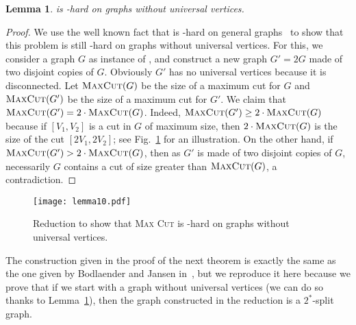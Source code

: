 \documentclass[
final
]{dmtcs-episciences}
\newtheorem{lemma}{Lemma}{\bfseries}{\itshape}
\begin{document}
\begin{lemma}\label{lemma4.3}
{} is {}-hard on graphs without universal vertices.		
\end{lemma}
\begin{proof}
We use the well known fact that {} is {}-hard on general graphs~\cite{garey1976some} to show that this problem is still {}-hard on graphs without universal vertices. For this, we consider a graph $G$ as instance of  {}, and construct a new graph $G'=2G$ made of two disjoint copies of $G$. Obviously $G'$ has no universal vertices because it is disconnected.
Let $\textsc{MaxCut}(G)$ be the size of a maximum cut for $G$ and $\textsc{MaxCut}(G')$ be the size of a maximum cut for $G'$. We claim that $\textsc{MaxCut}(G')=2 \cdot \textsc{MaxCut}(G)$. Indeed, $\textsc{MaxCut}(G')\geq 2 \cdot \textsc{MaxCut}(G)$ because if $[V_1,V_2]$ is a cut in $G$ of maximum size, then $2 \cdot \textsc{MaxCut}(G)$ is the size of the cut $[2V_1,2V_2]$; see Fig.~\ref{fig:no-universal-vertices} for an illustration. On the other hand, if $\textsc{MaxCut}(G')>2 \cdot \textsc{MaxCut}(G)$, then as $G'$ is made of two disjoint copies of $G$, necessarily $G$ contains a cut of size greater than $\textsc{MaxCut}(G)$, a contradiction.
\end{proof}

\begin{figure}[h]
\vspace{-1.2cm}
\begin{center}
 \texttt{[image: lemma10.pdf]}
\vspace{-.35cm}\caption{Reduction to show that \textsc{Max Cut} is {}-hard on graphs without universal vertices.} \label{fig:no-universal-vertices}\vspace{-.2cm}
\end{center}
\end{figure}

The construction given in the proof of the next theorem is exactly the same as the one given by  Bodlaender and Jansen in~\cite[Theorem 3.1]{bodlaender}, but we reproduce it here because we prove that if we start with a graph without universal vertices (we can do so thanks to Lemma~\ref{lemma4.3}), then the graph constructed in the reduction is a $2^*$-split graph.
\end{document}
